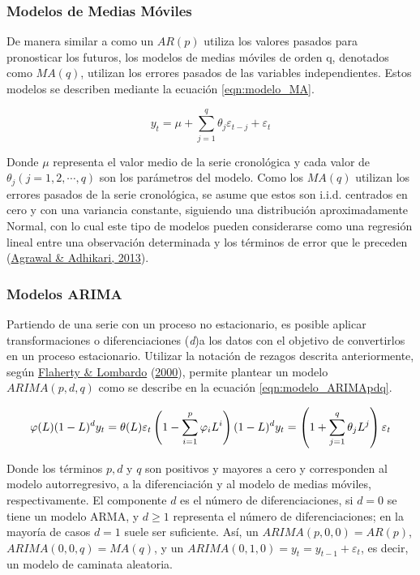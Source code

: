 \documentclass[
]{article}
\begin{document}
\subsubsection{Modelos de Medias Móviles}

De manera similar a como un \(AR(p)\) utiliza los valores pasados para
pronosticar los futuros, los modelos de medias móviles de orden q,
denotados como \(MA(q)\), utilizan los errores pasados de las variables
independientes. Estos modelos se describen mediante la ecuación
\ref{eqn:modelo_MA}.

\begin{equation}
\label{eqn:modelo_MA}
y_t=\mu+\sum_{j=1}^q \theta_j \varepsilon_{t-j}+\varepsilon_t
\end{equation}

Donde \(\mu\) representa el valor medio de la serie cronológica y cada
valor de \(\theta_j(j=1,2,\cdots,q)\) son los parámetros del modelo.
Como los \(MA(q)\) utilizan los errores pasados de la serie cronológica,
se asume que estos son i.i.d. centrados en cero y con una variancia
constante, siguiendo una distribución aproximadamente Normal, con lo
cual este tipo de modelos pueden considerarse como una regresión lineal
entre una observación determinada y los términos de error que le
preceden (\protect\hyperlink{ref-stationary_def}{Agrawal \& Adhikari,
2013}).

\subsubsection{Modelos ARIMA}

Partiendo de una serie con un proceso no estacionario, es posible
aplicar transformaciones o diferenciaciones (\emph{d})a los datos con el
objetivo de convertirlos en un proceso estacionario. Utilizar la
notación de rezagos descrita anteriormente, según
\protect\hyperlink{ref-Lombardo}{Flaherty \& Lombardo}
(\protect\hyperlink{ref-Lombardo}{2000}), permite plantear un modelo
\(ARIMA(p,d,q)\) como se describe en la ecuación
\ref{eqn:modelo_ARIMApdq}.

\begin{equation}
\label{eqn:modelo_ARIMApdq}
\varphi(L)(1-L)^dy_t=\theta(L)\varepsilon_t\\
\left(1-\sum_{i=1}^p \varphi_iL^i \right)(1-L)^d y_t=\left(1+\sum_{j=1}^q \theta_jL^j \right) \varepsilon_t
\end{equation}

Donde los términos \(p, d\) y \(q\) son positivos y mayores a cero y
corresponden al modelo autorregresivo, a la diferenciación y al modelo
de medias móviles, respectivamente. El componente \(d\) es el número de
diferenciaciones, si \(d=0\) se tiene un modelo ARMA, y \(d\geq1\)
representa el número de diferenciaciones; en la mayoría de casos \(d=1\)
suele ser suficiente. Así, un \(ARIMA(p,0,0)=AR(p)\),
\(ARIMA(0,0,q)=MA(q)\), y un \(ARIMA(0,1,0)=y_t=y_{t-1}+\varepsilon_t\),
es decir, un modelo de caminata aleatoria.
\end{document}
